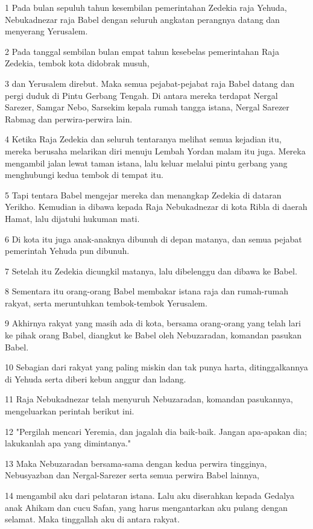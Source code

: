 \par 1 Pada bulan sepuluh tahun kesembilan pemerintahan Zedekia raja Yehuda, Nebukadnezar raja Babel dengan seluruh angkatan perangnya datang dan menyerang Yerusalem.
\par 2 Pada tanggal sembilan bulan empat tahun kesebelas pemerintahan Raja Zedekia, tembok kota didobrak musuh,
\par 3 dan Yerusalem direbut. Maka semua pejabat-pejabat raja Babel datang dan pergi duduk di Pintu Gerbang Tengah. Di antara mereka terdapat Nergal Sarezer, Samgar Nebo, Sarsekim kepala rumah tangga istana, Nergal Sarezer Rabmag dan perwira-perwira lain.
\par 4 Ketika Raja Zedekia dan seluruh tentaranya melihat semua kejadian itu, mereka berusaha melarikan diri menuju Lembah Yordan malam itu juga. Mereka mengambil jalan lewat taman istana, lalu keluar melalui pintu gerbang yang menghubungi kedua tembok di tempat itu.
\par 5 Tapi tentara Babel mengejar mereka dan menangkap Zedekia di dataran Yerikho. Kemudian ia dibawa kepada Raja Nebukadnezar di kota Ribla di daerah Hamat, lalu dijatuhi hukuman mati.
\par 6 Di kota itu juga anak-anaknya dibunuh di depan matanya, dan semua pejabat pemerintah Yehuda pun dibunuh.
\par 7 Setelah itu Zedekia dicungkil matanya, lalu dibelenggu dan dibawa ke Babel.
\par 8 Sementara itu orang-orang Babel membakar istana raja dan rumah-rumah rakyat, serta meruntuhkan tembok-tembok Yerusalem.
\par 9 Akhirnya rakyat yang masih ada di kota, bersama orang-orang yang telah lari ke pihak orang Babel, diangkut ke Babel oleh Nebuzaradan, komandan pasukan Babel.
\par 10 Sebagian dari rakyat yang paling miskin dan tak punya harta, ditinggalkannya di Yehuda serta diberi kebun anggur dan ladang.
\par 11 Raja Nebukadnezar telah menyuruh Nebuzaradan, komandan pasukannya, mengeluarkan perintah berikut ini.
\par 12 "Pergilah mencari Yeremia, dan jagalah dia baik-baik. Jangan apa-apakan dia; lakukanlah apa yang dimintanya."
\par 13 Maka Nebuzaradan bersama-sama dengan kedua perwira tingginya, Nebusyazban dan Nergal-Sarezer serta semua perwira Babel lainnya,
\par 14 mengambil aku dari pelataran istana. Lalu aku diserahkan kepada Gedalya anak Ahikam dan cucu Safan, yang harus mengantarkan aku pulang dengan selamat. Maka tinggallah aku di antara rakyat.
